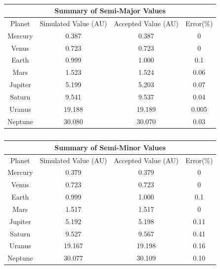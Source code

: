 \documentclass[a4paper,12pt]{article} %
\numberwithin{equation}{section} %
\numberwithin{figure}{section} %
\begin{document}
\begin{table}[h!]
\centering
\caption{}
\label{tab:table_1}
\begin{tabular}{|c|c|c|c|}
\hline
\multicolumn{4}{|c|}{Summary of Semi-Major Values}\\
\hline
Planet & Simulated Value (AU) & Accepted Value (AU) \cite{Semi-major_axis_info} & Error(\%)\\
\hline
Mercury & 0.387 & 0.387 & 0\\
\hline
Venus & 0.723 & 0.723 & 0\\
\hline
Earth & 0.999 & 1.000 & 0.1\\
\hline
Mars & 1.523 & 1.524 & 0.06\\
\hline
Jupiter & 5.199 & 5.203 & 0.07\\
\hline
Saturn & 9.541 & 9.537 & 0.04\\
\hline
Uranus & 19.188 & 19.189 & 0.005\\
\hline
Neptune & 30.080 & 30.070 & 0.03\\
\hline
\end{tabular}
\end{table}

\begin{table}[h!]
\centering
\caption{}
\label{tab:table_2}
\begin{tabular}{|c|c|c|c|}
\hline
\multicolumn{4}{|c|}{Summary of Semi-Minor Values}\\
\hline
Planet & Simulated Value (AU) & Accepted Value (AU) \cite{Semi-minor_axis_info} & Error(\%)\\
\hline
Mercury & 0.379 & 0.379 & 0\\
\hline
Venus & 0.723 & 0.723 & 0\\
\hline
Earth & 0.999 & 1.000 & 0.1\\
\hline
Mars & 1.517 & 1.517 & 0\\
\hline
Jupiter & 5.192 & 5.198 & 0.11\\
\hline
Saturn & 9.527 & 9.567 & 0.41\\
\hline
Uranus & 19.167 & 19.198 & 0.16\\
\hline
Neptune & 30.077 & 30.109 & 0.10\\
\hline
\end{tabular}
\end{table}
\end{document}
